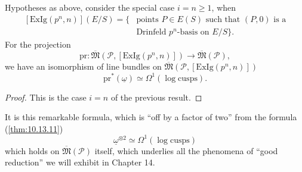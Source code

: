 \begin{kcor}\label{cor:12.10.8}
Hypotheses as above, consider the special case $i = n \ge 1$, when
\begin{align*}
{}[\mathrm{ExIg}(p^n, n)](E/S) = \bigl\{&\text{points } P \in E(S) \text{ such that } (P, 0) \text{ is a} \\
&\text{Drinfeld } p^n\text{-basis on } E/S\bigr\} .
\end{align*}
For the projection
\[
\mathrm{pr} : \overline{\mathfrak{M}}(\mathcal{P}, [\mathrm{ExIg}(p^n, n)]) \to \overline{\mathfrak{M}}(\mathcal{P}) ,
\]
we have an isomorphism of line bundles on $\overline{\mathfrak{M}}(\mathcal{P}, [\mathrm{ExIg}(p^n, n)])$
\[
\mathrm{pr}^*(\underline{\omega}) \simeq \Omega^1(\log\mathrm{cusps}) .
\]
\end{kcor}

\begin{proof}
This is the case $i = n$ of the previous result.
\end{proof}

\begin{krem}\label{rem:12.10.9}
It is this remarkable formula, which is ``off by a factor of two'' from the formula (\ref{thm:10.13.11})
\[
\underline{\omega}^{\otimes 2} \simeq \Omega^1(\log\mathrm{cusps})
\]
which holds on $\overline{\mathfrak{M}}(\mathcal{P})$ itself, which underlies all the phenomena of ``good reduction'' we will exhibit in Chapter 14.
\end{krem}
